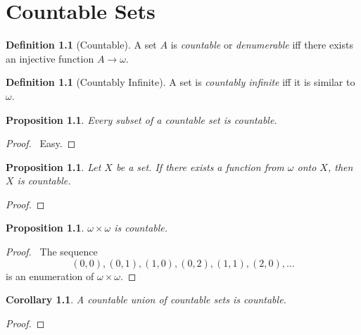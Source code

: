 \documentclass{report}
\let\qed\relax
\newtheorem{prop}[ax]{Proposition}
\newtheorem{cor}{Corollary}[ax]
\theoremstyle{definition}
\newtheorem{df}[ax]{Definition}
\begin{document}
\chapter{Countable Sets}

\begin{df}[Countable]
A set $A$ is \emph{countable} or \emph{denumerable} iff there exists an injective function $A \rightarrow \omega$.
\end{df}

\begin{df}[Countably Infinite]
A set is \emph{countably infinite} iff it is similar to $\omega$.
\end{df}

\begin{prop}
Every subset of a countable set is countable.
\end{prop}

\begin{proof}
\pf\ Easy. \qed
\end{proof}

\begin{prop}
Let $X$ be a set. If there exists a function from $\omega$ onto $X$, then $X$ is countable.
\end{prop}

\begin{proof}
\pf
{}
\qed
\end{proof}

\begin{prop}
$\omega \times \omega$ is countable.
\end{prop}

\begin{proof}
\pf\ The sequence
\[ (0,0), (0,1), (1,0), (0,2), (1,1), (2,0), \ldots \]
is an enumeration of $\omega \times \omega$. \qed
\end{proof}

\begin{cor}
A countable union of countable sets is countable.
\end{cor}

\begin{proof}
\pf
{}
\qed
\end{proof}
\end{document}
